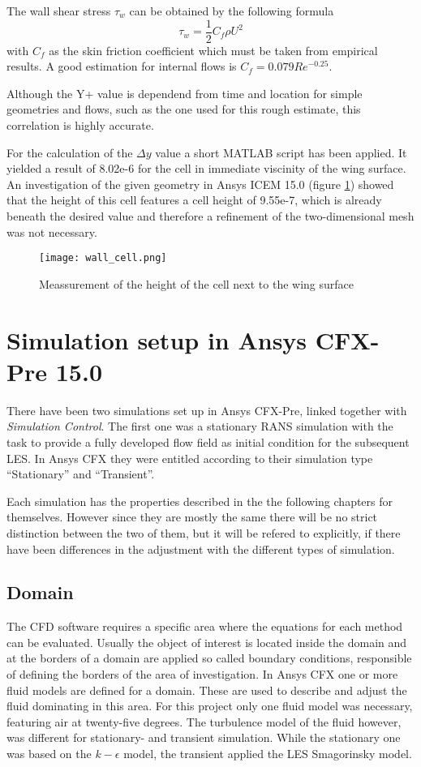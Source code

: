 The wall shear stress $\tau_w$ can be obtained by the following formula
\begin{equation}
\tau_w = \frac{1}{2} C_f \rho U^2
\end{equation}
with $C_f$ as the skin friction coefficient which must be taken from empirical results. A good estimation for internal flows is $C_f = 0.079 Re^{-0.25}$.

Although the Y+ value is dependend from time and location for simple geometries and flows, such as the one used for this rough estimate, this correlation is highly accurate.

For the calculation of the $\Delta y$ value a short MATLAB\textsuperscript{\textregistered} script has been applied. It yielded a result of 8.02e-6 for the cell in immediate viscinity of the wing surface. An investigation of the given geometry in Ansys ICEM 15.0 (figure \ref{fig:y1_height}) showed that the height of this cell features a cell height of 9.55e-7, which is already beneath the desired value and therefore a refinement of the two-dimensional mesh was not necessary. 
\begin{figure}[ht]
\centering
\texttt{[image: wall\_cell.png]}
\caption{Meassurement of the height of the cell next to the wing surface}
\label{fig:y1_height}
\end{figure}

\section{Simulation setup in Ansys CFX-Pre 15.0}
There have been two simulations set up in Ansys CFX-Pre, linked together with \emph{Simulation Control}. The first one was a stationary RANS simulation with the task to provide a fully developed flow field as initial condition for the subsequent LES. In Ansys CFX they were entitled according to their simulation type ``Stationary'' and ``Transient''.

Each simulation has the properties described in the the following chapters for themselves. However since they are mostly the same there will be no strict distinction between the two of them, but it will be refered to explicitly, if there have been differences in the adjustment with the different types of simulation.
\subsection{Domain}
The CFD software requires a specific area where the equations for each method can be evaluated. Usually the object of interest is located inside the domain and at the borders of a domain are applied so called boundary conditions, responsible of defining the borders of the area of investigation.
In Ansys CFX one or more fluid models are defined for a domain. These are used to describe and adjust the fluid dominating in this area. For this project only one fluid model was necessary, featuring air at twenty-five degrees.
The turbulence model of the fluid however, was different for stationary- and transient simulation. While the stationary one was based on the $k-\epsilon$ model, the transient applied the LES Smagorinsky model.
